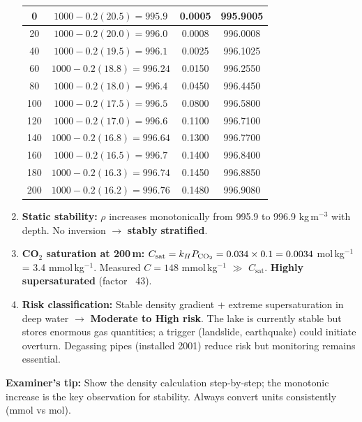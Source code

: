 \documentclass[11pt]{article}
\begin{document}
\begin{exoresolu}
\begin{enumerate}
\begin{center}
\begin{tabular}{|c|c|c|c|}
0 & $1000-0.2(20.5)=995.9$ & 0.0005 & 995.9005\\\hline
20 & $1000-0.2(20.0)=996.0$ & 0.0008 & 996.0008\\\hline
40 & $1000-0.2(19.5)=996.1$ & 0.0025 & 996.1025\\\hline
60 & $1000-0.2(18.8)=996.24$ & 0.0150 & 996.2550\\\hline
80 & $1000-0.2(18.0)=996.4$ & 0.0450 & 996.4450\\\hline
100 & $1000-0.2(17.5)=996.5$ & 0.0800 & 996.5800\\\hline
120 & $1000-0.2(17.0)=996.6$ & 0.1100 & 996.7100\\\hline
140 & $1000-0.2(16.8)=996.64$ & 0.1300 & 996.7700\\\hline
160 & $1000-0.2(16.5)=996.7$ & 0.1400 & 996.8400\\\hline
180 & $1000-0.2(16.3)=996.74$ & 0.1450 & 996.8850\\\hline
200 & $1000-0.2(16.2)=996.76$ & 0.1480 & 996.9080\\\hline
\end{tabular}
\end{center}
\item \textbf{Static stability:} $\rho$ increases monotonically from 995.9 to 996.9 kg\,m$^{-3}$ with depth. No inversion $\rightarrow$ \textbf{stably stratified}.
\item \textbf{CO$_2$ saturation at 200\,m:} $C_{\text{sat}} = k_H P_{\ce{CO2}} = 0.034 \times 0.1 = 0.0034$ mol\,kg$^{-1}$ = 3.4 mmol\,kg$^{-1}$. Measured $C = 148$ mmol\,kg$^{-1}$ $\gg$ $C_{\text{sat}}$. \textbf{Highly supersaturated} (factor ~43).
\item \textbf{Risk classification:} Stable density gradient + extreme supersaturation in deep water $\rightarrow$ \textbf{Moderate to High risk}. The lake is currently stable but stores enormous gas quantities; a trigger (landslide, earthquake) could initiate overturn. Degassing pipes (installed 2001) reduce risk but monitoring remains essential.
\end{enumerate}
\textbf{Examiner's tip:} Show the density calculation step‑by‑step; the monotonic increase is the key observation for stability. Always convert units consistently (mmol vs mol).
\end{exoresolu}
\end{document}
